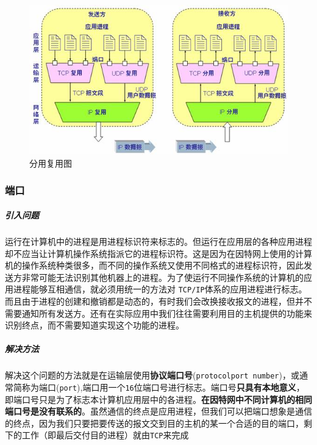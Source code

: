 \documentclass[UTF8,a4paper,12pt]{ctexbook}
\begin{document}
				\begin{figure}[h]
					\centering
					\includegraphics[scale = 0.8]{figures/TCP-MM.jpg}
					\caption{分用复用图}
					\label{MM}
				\end{figure}
	
			\subsubsection{端口}
				\subparagraph{引入问题}
					运行在计算机中的进程是用进程标识符来标志的。但运行在应用层的各种应用进程却不应当让计算机操作系统指派它的进程标识符。这是因为在因特网上使用的计算机的操作系统种类很多，而不同的操作系统又使用不同格式的进程标识符，因此发送方非常可能无法识别其他机器上的进程。为了使运行不同操作系统的计算机的应用进程能够互相通信，就必须用统一的方法对 \verb|TCP/IP|体系的应用进程进行标志。而且由于进程的创建和撤销都是动态的，有时我们会改换接收报文的进程，但并不需要通知所有发送方。还有在实际应用中我们往往需要利用目的主机提供的功能来识别终点，而不需要知道实现这个功能的进程。
				
				\subparagraph{解决方法}
					解决这个问题的方法就是在运输层使用\textbf{协议端口号}(\verb|protocolport number|)，或通常简称为端口(\verb|port|),端口用一个\verb|16|位端口号进行标志。端口号\textbf{只具有本地意义}，即端口号只是为了标志本计算机应用层中的各进程。\textbf{在因特网中不同计算机的相同端口号是没有联系的}。虽然通信的终点是应用进程，但我们可以把端口想象是通信的终点，因为我们只要把要传送的报文交到目的主机的某一个合适的目的端口，剩下的工作（即最后交付目的进程）就由\verb|TCP|来完成
				
\end{document}
